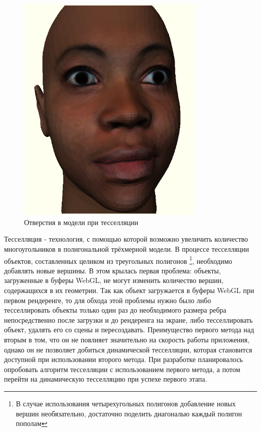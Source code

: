 \documentclass[12pt, a4paper]{article}
\begin{document}
\begin{figure}[htb]
\centering
\includegraphics[width=0.8\textwidth]{holes-in-model.png}
\caption{Отверстия в модели при тесселляции}
\label{fig:holes-in-model}
\end{figure}

Тесселляция - технология, с помощью которой возможно увеличить количество
многоугольников в полигональной трёхмерной модели. В процессе тесселляции
объектов, составленных целиком из треугольных полигонов \footnote{В случае
использования четырехугольных полигонов добавление новых вершин необязательно,
достаточно поделить диагональю каждый полигон пополам}, необходимо добавлять
новые вершины. В этом крылась первая проблема: объекты, загруженные в буферы
WebGL, не могут изменить количество вершин, содержащихся в их геометрии. Так как
объект загружается в буферы WebGL при первом рендеренге, то для обхода этой
проблемы нужно было либо тесселлировать объекты только один раз до
необходимого размера ребра непосредственно после загрузки и до рендеренга на
экране, либо тесселлировать объект, удалять его со сцены и пересоздавать.
Преимущество первого метода над вторым в том, что он не повлияет значительно на
скорость работы приложения, однако он не позволяет добиться динамической
тесселляции, которая становится доступной при использовании второго метода.
При разработке планировалось опробовать алгоритм тесселляции с использованием
первого метода, а потом перейти на динамическую тесселляцию при успехе первого
этапа.
\end{document}
